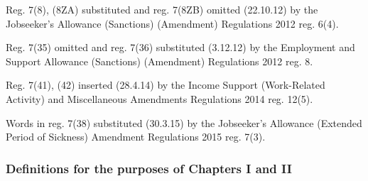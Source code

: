 \documentclass[12pt,a4paper]{article}
\begin{document}
{Reg. 7(8), (8ZA) substituted and reg. 7(8ZB) omitted (22.10.12) by the Jobseeker’s Allowance (Sanctions) (Amendment) Regulations 2012 reg. 6(4).

Reg. 7(35) omitted and reg. 7(36) substituted (3.12.12) by the Employment and Support Allowance (Sanctions) (Amendment) Regulations 2012 reg. 8.

Reg. 7(41), (42) inserted (28.4.14) by the Income Support (Work-Related Activity) and Miscellaneous Amendments Regulations 2014 reg. 12(5).

Words in reg. 7(38) substituted (30.3.15) by the Jobseeker’s Allowance (Extended Period of Sickness) Amendment Regulations 2015 reg. 7(3).
}


\subsubsection[7A. Definitions for the purposes of Chapters I and II]{Definitions for the purposes of Chapters I and II}
\end{document}
